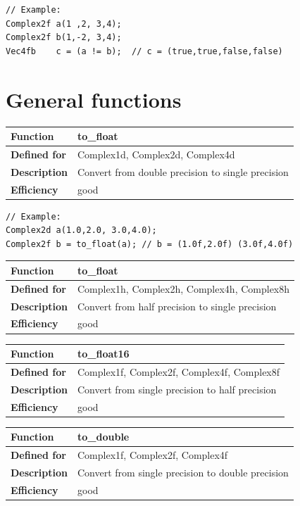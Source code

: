 \documentclass[11pt,a4paper,oneside,openright]{report}
\newcommand{\vspacesmall}{\vspace{3mm}}
\newcommand{\vspacebig}{\vspace{6mm}}
\begin{document}
\begin{lstlisting}[frame=none]
// Example:
Complex2f a(1 ,2, 3,4);
Complex2f b(1,-2, 3,4);
Vec4fb    c = (a != b);  // c = (true,true,false,false)
\end{lstlisting}
\vspacebig


\chapter{General functions}\label{chap:GeneralFunctions}

\begin{tabular}{|p{25mm}|p{100mm}|}
\hline
\bfseries Function & to\_float \\ \hline
\bfseries Defined for & Complex1d, Complex2d, Complex4d  \\ \hline
\bfseries Description & Convert from double precision to single precision \\ \hline
\bfseries Efficiency & good \\ \hline
\end{tabular}
\vspacesmall

\begin{lstlisting}[frame=none]
// Example:
Complex2d a(1.0,2.0, 3.0,4.0);
Complex2f b = to_float(a); // b = (1.0f,2.0f) (3.0f,4.0f)
\end{lstlisting}
\vspacebig

\begin{tabular}{|p{25mm}|p{100mm}|}
\hline
\bfseries Function & to\_float \\ \hline
\bfseries Defined for & Complex1h, Complex2h, Complex4h, Complex8h  \\ \hline
\bfseries Description & Convert from half precision to single precision \\ \hline
\bfseries Efficiency & good \\ \hline
\end{tabular}
\vspacesmall

\begin{tabular}{|p{25mm}|p{100mm}|}
\hline
\bfseries Function & to\_float16 \\ \hline
\bfseries Defined for & Complex1f, Complex2f, Complex4f, Complex8f  \\ \hline
\bfseries Description & Convert from single precision to half precision \\ \hline
\bfseries Efficiency & good \\ \hline
\end{tabular}
\vspacesmall

\begin{tabular}{|p{25mm}|p{100mm}|}
\hline
\bfseries Function & to\_double \\ \hline
\bfseries Defined for & Complex1f, Complex2f, Complex4f  \\ \hline
\bfseries Description & Convert from single precision to double precision \\ \hline
\bfseries Efficiency & good \\ \hline
\end{tabular}
\vspacesmall
\end{document}
